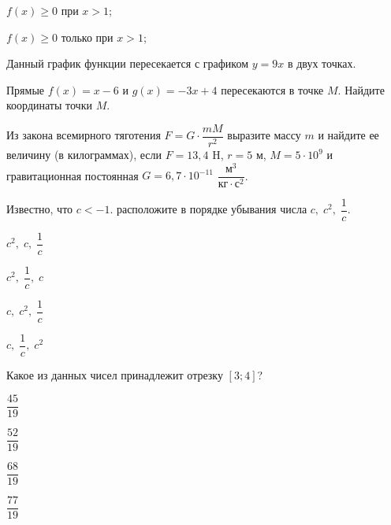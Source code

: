 \begin{homework}[number=1]
\begin{listofex}
\begin{enumcols}[itemcolumns=1]
			\item \( f(x)\ge0 \) при \( x>1 \);
			\item \( f(x)\ge0 \) только при \( x>1 \);
			\item Данный график функции пересекается с графиком \( y=9x \) в двух точках.
		\end{enumcols}
		\item Прямые \( f(x) = x - 6 \) и \( g(x) = -3x + 4 \) пересекаются в точке \( M \). Найдите координаты точки \( M \).
		\item {}
		\item Из закона всемирного тяготения \( F=G\cdot\dfrac{mM}{r^2} \) выразите массу \( m \) и найдите ее величину (в килограммах), если \( F=13,4 \) H, \( r=5 \) м, \( M=5\cdot10^9 \) и гравитационная постоянная \( G=6,7\cdot10^{-11} \) \( \dfrac{\text{м}^3}{\text{кг}\cdot\text{с}^2} \).
		\newpage
		\item Известно, что \( c<-1 \). расположите в порядке убывания числа \( c,\; c^2,\; \dfrac{1}{c}\).
		\begin{enumcols}[itemcolumns=4]
			\item \( c^2,\; c,\; \dfrac{1}{c} \)
			\item \( c^2,\; \dfrac{1}{c},\; c \)
			\item \( c,\; c^2,\; \dfrac{1}{c} \)
			\item \( c,\; \dfrac{1}{c},\; c^2 \)
		\end{enumcols}
	\item Какое из данных чисел принадлежит отрезку \( [3;4] \)?
		\begin{enumcols}[itemcolumns=4]
			\item \( \dfrac{45}{19} \)
			\item \( \dfrac{52}{19} \)
			\item \( \dfrac{68}{19} \)
			\item \( \dfrac{77}{19} \)
		\end{enumcols}
	\end{listofex}
\end{homework}

